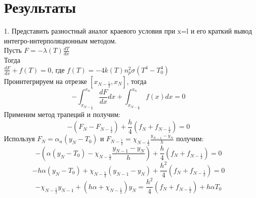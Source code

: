 \documentclass[14pt, a4paper]{extarticle}
\begin{document}
\section*{Результаты}
1. Представить разностный аналог краевого условия при x=l и его краткий вывод интегро-интерполяционным методом.	\\
Пусть $F = -\lambda(T)\frac{dT}{dx}$\\
Тогда\\
$\frac{dF}{dx} + f(T) = 0$, где $f(T) = - 4k(T)n^{2}_{p}\sigma(T^4 -T^{4}_{0})$\\
Проинтегрируем на отрезке $[x_{N-\frac{1}{2}}, x_N]$, тогда\\
\begin{equation*}
	-\int_{x_{N-\frac{1}{2}}}^{x_n}\frac{dF}{dx}dx+\int_{x_{N-\frac{1}{2}}}^{x_n}f(x)dx = 0 
\end{equation*}
Применим метод трапеций и получим:
\begin{equation*}
	-(F_N - F_{N-\frac{1}{2}})+\frac{h}{4}(f_N+f_{N-\frac{1}{2}}) = 0
\end{equation*}
Используя $F_N = \alpha_n(y_N - T_0)$ и 
$F_{N- \frac{1}{2}} = \chi_{N-\frac{1}{2}}\frac{y_{N-1} - y_N}{h}$
получим:\\
\begin{equation*}
	-(\alpha(y_N-T_0) - \chi_{N-\frac{1}{2}}\frac{y_{N-1} - y_N}{h}) + \frac{h}{4}(f_N + f_{N-\frac{1}{2}}) = 0
\end{equation*}
\begin{equation*}
	-h\alpha(y_N-T_0) + \chi_{N-\frac{1}{2}}(y_{N-1} - y_N)+\frac{h^2}{4}(f_N+f_{N-\frac{1}{2}}) = 0
\end{equation*}
\begin{equation*}
	-\chi_{N-\frac{1}{2}}y_{N-1} + (h\alpha + \chi_{N - \frac{1}{2}})y_N = \frac{h^2}{4}(f_N+f_{N-\frac{1}{2}}) + h\alpha T_0
\end{equation*}
\end{document}
